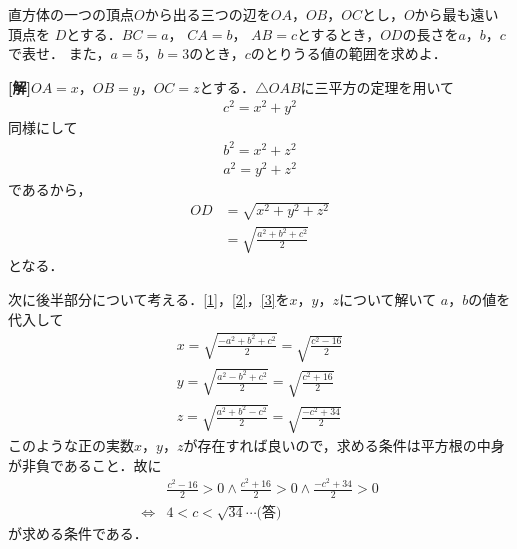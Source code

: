 \documentclass[a4j]{jarticle}
\begin{document}

     \begin{oframed}
     直方体の一つの頂点$O$から出る三つの辺を$OA$，$OB$，$OC$とし，$O$から最も遠い頂点を
     $D$とする．$BC=a$， $CA=b$， $AB=c$とするとき，$OD$の長さを$a$，$b$，$c$で表せ．
     また，$a=5$，$b=3$のとき，$c$のとりうる値の範囲を求めよ．
     \end{oframed}

\setlength{\columnseprule}{0.4pt}
\begin{multicols}{2}
{\bf[解]}$OA=x$，$OB=y$，$OC=z$とする．$\triangle OAB$に三平方の定理を用いて
     \begin{align}
     c^2=x^2+y^2　\label{1}
     \end{align}
同様にして
     \begin{align}
     b^2=x^2+z^2  \label{2}\\
     a^2=y^2+z^2 \label{3}
     \end{align}
であるから，
     \begin{align*}
     OD&=\sqrt{x^2+y^2+z^2} \\
     &=\sqrt{\frac{a^2+b^2+c^2}{2}}\tag{答}
     \end{align*}
となる．

次に後半部分について考える．\eqref{1}，\eqref{2}，\eqref{3}を$x$，$y$，$z$について解いて          
$a$，$b$の値を代入して
      \begin{align*}
      x=\sqrt{\frac{-a^2+b^2+c^2}{2}}=\sqrt{\frac{c^2-16}{2}} \\
      y=\sqrt{\frac{a^2-b^2+c^2}{2}}=\sqrt{\frac{c^2+16}{2}} \\
      z=\sqrt{\frac{a^2+b^2-c^2}{2}}=\sqrt{\frac{-c^2+34}{2}} 
      \end{align*}
このような正の実数$x$，$y$，$z$が存在すれば良いので，求める条件は平方根の中身が非負であること．故に
     \begin{align*}
     &\frac{c^2-16}{2}>0\land\frac{c^2+16}{2}>0\land\frac{-c^2+34}{2}>0  \\
     \Longleftrightarrow&4<c<\sqrt{34}\cdots\text{(答)}  \tag{$\because c>0$} 
     \end{align*}
が求める条件である．   
\newpage
\end{multicols}
\end{document}
